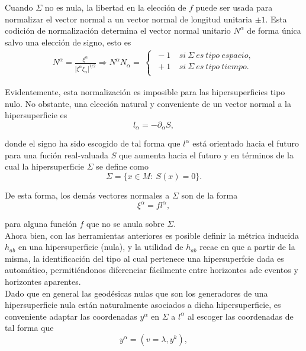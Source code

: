 \documentclass{article}
\numberwithin{equation}{section}
\theoremstyle{definition}
\begin{document}
Cuando $\Sigma$ no es nula, la libertad en la elección de $f$ puede ser usada para normalizar el vector normal a un vector normal de longitud unitaria $\pm 1$. Esta codición de normalización determina el vector normal unitario $N^{\alpha}$ de forma única salvo una elección de signo, esto es
\begin{align*}
N^{\alpha} = \frac{\xi^{\alpha}}{|\xi^{\alpha}\xi_{\alpha}|^{1/2}} \Rightarrow N^{\alpha}N_{\alpha} =\ 
\begin{cases}
\ -1 & \ si\ \Sigma\ es\ tipo\ espacio,\\
\ +1 & \ si\ \Sigma\ es\ tipo\ tiempo.\\
\end{cases}
\end{align*}

Evidentemente, esta normalización es imposible para las hipersuperficies tipo nulo. No obstante, una elección natural y conveniente de un vector normal a la hipersuperficie es 
\begin{equation*}
l_\alpha = -\partial_\alpha S,
\end{equation*}

donde el signo ha sido escogido de tal forma que $l^\alpha$ está orientado hacia el futuro para una fución real-valuada $S$ que aumenta hacia el futuro y en términos de la cual la hipersuperficie $\Sigma$ se define como
\begin{equation*}
\Sigma = \lbrace x \in M:\ S(x) = 0 \rbrace.
\end{equation*}

De esta forma, los demás vectores normales a $\Sigma$ son de la forma
\begin{equation*}
\xi^\alpha = fl^\alpha,
\end{equation*}

para alguna función $f$ que no se anula sobre $\Sigma$.\\

Ahora bien, con las herramientas anteriores es posible definir la métrica inducida $h_{ab}$ en una hipersuperficie (nula), y la utilidad de $h_{ab}$ recae en que a partir de la misma, la identificación del tipo al cual pertenece una hipersuperfcie dada es automático, permitiéndonos diferenciar fácilmente entre horizontes ade eventos y horizontes aparentes.\\

Dado que en general las geodésicas nulas que son los generadores de una hipersuperficie nula están naturalmente asociados a dicha hipersuperficie, es conveniente adaptar las coordenadas $y^\alpha$ en $\Sigma$ a $l^\alpha$ al escoger las coordenadas de tal forma que 
\begin{equation*}
y^\alpha = (v = \lambda, y^k),
\end{equation*}
\end{document}
